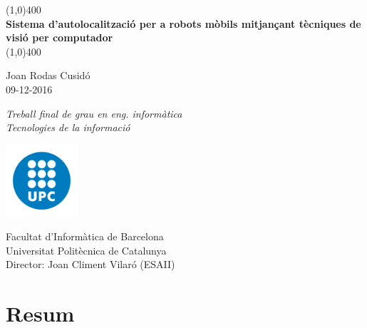 \documentclass[a4paper,12pt]{report}
\begin{document}

	\begin{titlepage}
		\begin{center}
			\vspace*{1cm}

			\line(1,0){400}\\
			\vspace{0.3cm}
			\Huge
			\textbf{Sistema d'autolocalització per a robots mòbils mitjançant tècniques de visió per computador}\\
			\line(1,0){400}

			\vspace{1.0cm}
			\Large
			Joan Rodas Cusidó\\
			09-12-2016

			\vfill
			\LARGE
			\textit{Treball final de grau en eng. informàtica\\
			Tecnologies de la informació}\\

			\vspace{3cm}

			\includegraphics[width=0.2\textwidth]{images/logo}
			
			\vspace{0.5cm}

			\Large
			Facultat d'Informàtica de Barcelona\\
			Universitat Politècnica de Catalunya\\
			Director: Joan Climent Vilaró (ESAII)
		\end{center}
	\end{titlepage}

	\restoregeometry
	\setcounter{page}{2}

	\chapter*{Resum}
	
\end{document}
